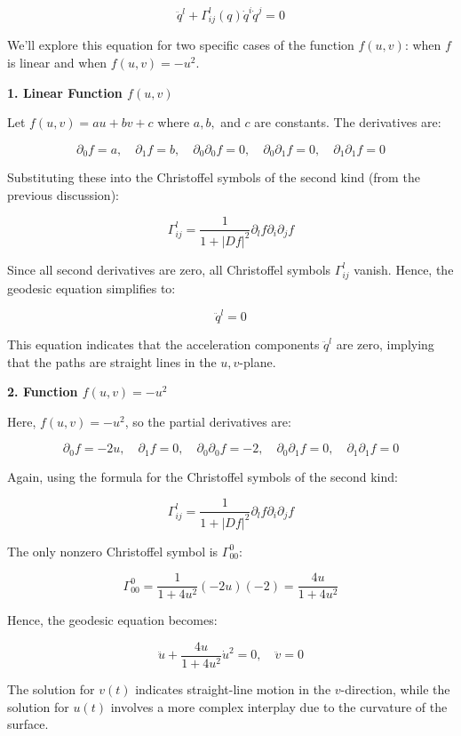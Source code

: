 \documentclass{article}
\begin{document}
\[
\ddot{q}^l + \Gamma^l_{ij}(q) \dot{q}^i \dot{q}^j = 0
\]

We'll explore this equation for two specific cases of the function \( f(u, v) \): when \( f \) is linear and when \( f(u, v) = -u^2 \).

\textbf{1. Linear Function \( f(u, v) \)}

Let \( f(u, v) = au + bv + c \) where \( a, b, \) and \( c \) are constants. The derivatives are:

\[
\partial_0 f = a, \quad \partial_1 f = b, \quad \partial_0 \partial_0 f = 0, \quad \partial_0 \partial_1 f = 0, \quad \partial_1 \partial_1 f = 0
\]

Substituting these into the Christoffel symbols of the second kind (from the previous discussion):

\[
\Gamma^l_{ij} = \frac{1}{1 + |Df|^2} \partial_l f \partial_i \partial_j f
\]

Since all second derivatives are zero, all Christoffel symbols \( \Gamma^l_{ij} \) vanish. Hence, the geodesic equation simplifies to:

\[
\ddot{q}^l = 0
\]

This equation indicates that the acceleration components \( \ddot{q}^l \) are zero, implying that the paths are straight lines in the \( u,v \)-plane.

\textbf{2. Function \( f(u, v) = -u^2 \)}

Here, \( f(u, v) = -u^2 \), so the partial derivatives are:

\[
\partial_0 f = -2u, \quad \partial_1 f = 0, \quad \partial_0 \partial_0 f = -2, \quad \partial_0 \partial_1 f = 0, \quad \partial_1 \partial_1 f = 0
\]

Again, using the formula for the Christoffel symbols of the second kind:

\[
\Gamma^l_{ij} = \frac{1}{1 + |Df|^2} \partial_l f \partial_i \partial_j f
\]

The only nonzero Christoffel symbol is \( \Gamma^0_{00} \):

\[
\Gamma^0_{00} = \frac{1}{1 + 4u^2}(-2u)(-2) = \frac{4u}{1 + 4u^2}
\]

Hence, the geodesic equation becomes:

\[
\ddot{u} + \frac{4u}{1 + 4u^2} \dot{u}^2 = 0, \quad \ddot{v} = 0
\]

The solution for \( v(t) \) indicates straight-line motion in the \( v \)-direction, while the solution for \( u(t) \) involves a more complex interplay due to the curvature of the surface.
\end{document}
